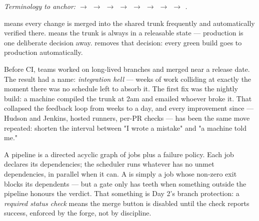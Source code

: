 \begin{center}\small\itshape\color{cInk!70}
Terminology to anchor:  $\rightarrow$  $\rightarrow$  $\rightarrow$  $\rightarrow$  $\rightarrow$  $\rightarrow$  $\rightarrow$  $\rightarrow$ .
\end{center}



  means every change is merged into the shared trunk frequently and automatically verified there.  means the trunk is always in a releasable state --- production is one deliberate decision away.  removes that decision: every green build goes to production automatically.

 Before CI, teams worked on long-lived branches and merged near a release date. The result had a name: \emph{integration hell} --- weeks of work colliding at exactly the moment there was no schedule left to absorb it. The first fix was the nightly build: a machine compiled the trunk at 2am and emailed whoever broke it. That collapsed the feedback loop from weeks to a day, and every improvement since --- Hudson and Jenkins, hosted runners, per-PR checks --- has been the same move repeated: shorten the interval between "I wrote a mistake" and "a machine told me."

 A pipeline is a directed acyclic graph of jobs plus a failure policy. Each job declares its dependencies; the scheduler runs whatever has no unmet dependencies, in parallel when it can. A  is simply a job whose non-zero exit blocks its dependents --- but a gate only has teeth when something outside the pipeline honours the verdict. That something is Day 2's branch protection: a \emph{required status check} means the merge button is disabled until the check reports success, enforced by the forge, not by discipline.


